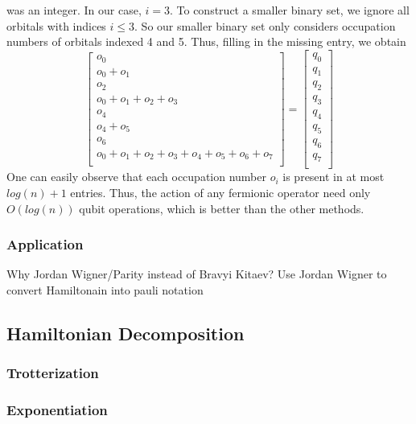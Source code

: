 \documentclass{article}
\begin{document}
    was an integer. In our case, \( i = 3\). To construct a smaller binary set,
    we ignore all orbitals with indices \(i \leq 3\). So our smaller binary set
    only considers occupation numbers of orbitals indexed 4 and 5. Thus, filling
    in the missing entry, we obtain
    \[
    \begin{bmatrix}
     o_0\\
     o_0 + o_1\\
     o_2  \\
     o_0 + o_1 + o_2 +o_3\\
     o_4 \\
     o_4 + o_5\\
     o_6  \\
     o_0 + o_1 + o_2 +o_3 + o_4 + o_5 + o_6 +o_7\\
    \end{bmatrix}
    =
    \begin{bmatrix}
    q_0 \\
    q_1 \\
    q_2 \\
    q_3 \\
    q_4 \\
    q_5 \\
    q_6 \\
    q_7 \\
    \end{bmatrix}
    \]
    One can easily observe that each occupation number \(o_i\) is present
    in at most \(log(n) + 1\) entries. Thus, the action of any fermionic
    operator need only \(O(log(n))\) qubit operations, which is better than
    the other methods.
    \subsubsection{Application}
    Why Jordan Wigner/Parity instead of Bravyi Kitaev?
    Use Jordan Wigner to convert Hamiltonain into pauli notation
  \subsection{Hamiltonian Decomposition}
    \subsubsection{Trotterization}
    \subsubsection{Exponentiation}
\end{document}
